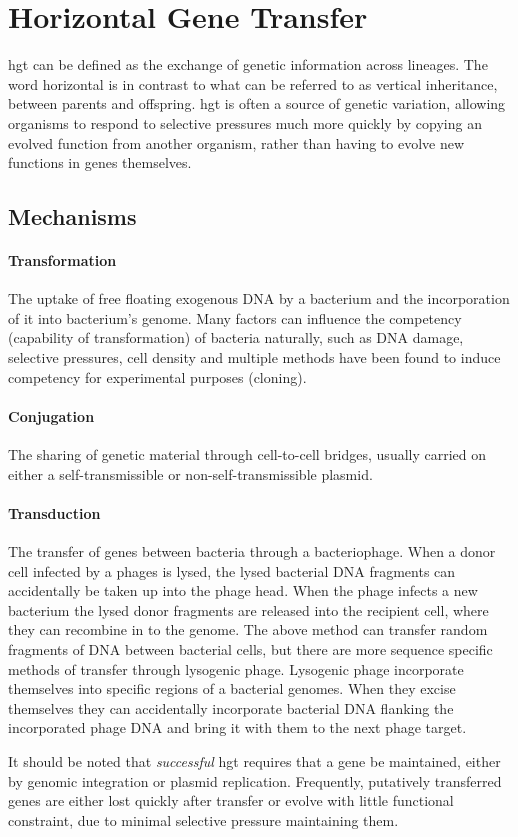\documentclass[12pt,letter]{article}
\begin{document}
\section*{Horizontal Gene Transfer}
\ac{hgt} can be defined as the exchange of genetic information across lineages\citep{lgt}.
The word horizontal is in contrast to what can be referred to as vertical inheritance, between parents and offspring\citep{ihgt}.
\ac{hgt} is often a source of genetic variation, allowing organisms to respond to selective pressures much more quickly by copying an evolved function from another organism, rather than having to evolve new functions in genes themselves\citep{ihgt,adaevo}.\par
\subsection*{Mechanisms}
\paragraph{Transformation}
The uptake of free floating exogenous DNA by a bacterium and the incorporation of it into bacterium's genome\citep{lgt}.
Many factors can influence the competency (capability of transformation) of bacteria naturally, such as DNA damage, selective pressures, cell density and multiple methods have been found to induce competency for experimental purposes (cloning)\citep{natcomp}.
\paragraph{Conjugation}
The sharing of genetic material through cell-to-cell bridges, usually carried on either a self-transmissible or non-self-transmissible plasmid\citep{conjug}.
\paragraph{Transduction}
The transfer of genes between bacteria through a bacteriophage\citep{transd}.
When a donor cell infected by a phages is lysed, the lysed bacterial DNA fragments can accidentally be taken up into the phage head\citep{transd}.
When the phage infects a new bacterium the lysed donor fragments are released into the recipient cell, where they can recombine in to the genome\citep{transd}.
The above method can transfer random fragments of DNA between bacterial cells, but there are more sequence specific methods of transfer through lysogenic phage\citep{transd}.
Lysogenic phage incorporate themselves into specific regions of a bacterial genomes\citep{transd}.
When they excise themselves they can accidentally incorporate bacterial DNA flanking the incorporated phage DNA and bring it with them to the next phage target\citep{transd}.\par
It should be noted that \textit{successful} \ac{hgt} requires that a gene be maintained, either by genomic integration or plasmid replication.
Frequently, putatively transferred genes are either lost quickly after transfer or evolve with little functional constraint, due to minimal selective pressure maintaining them\citep{fastlane}.
\end{document}
